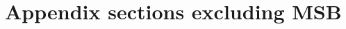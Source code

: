 \documentclass[12pt]{article}
\begin{document}
\clearpage
\section{Appendix sections excluding MSB}




 \begin{table}[H]
                \centering
                \caption{Interval Model of Consumer WTP for Oranges (Baseline: BDM Real)}
                \label{tab:MSB_interval_regression_multiple_comaparisons}
\end{table}
\end{document}
